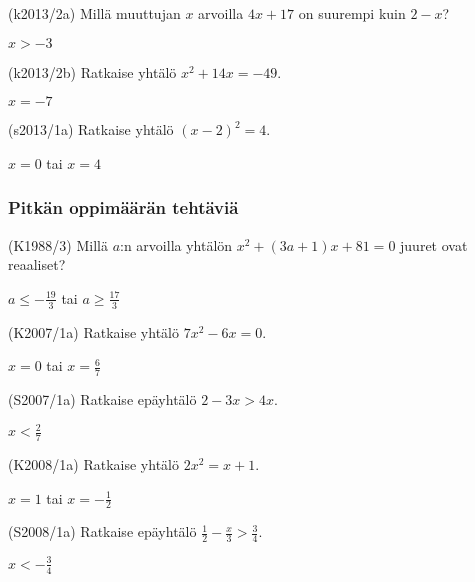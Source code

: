 \begin{tehtava}
(k2013/2a) Millä muuttujan $x$ arvoilla $4x+17$ on suurempi kuin $2-x$?
\begin{vastaus}
$x>-3$
\end{vastaus}
\end{tehtava}

\begin{tehtava}
(k2013/2b) Ratkaise yhtälö $x^2+14x=-49$.
\begin{vastaus}
$x=-7$
\end{vastaus}
\end{tehtava}

\begin{tehtava}
(s2013/1a) Ratkaise yhtälö $(x-2)^2=4$.
\begin{vastaus}
$x=0$ tai $x=4$ 
\end{vastaus}
\end{tehtava}

\subsubsection*{Pitkän oppimäärän tehtäviä}

\begin{tehtava}
(K1988/3) Millä $a$:n arvoilla yhtälön $x^2+(3a+1)x+81=0$ juuret ovat reaaliset?
\begin{vastaus}
$a \leq -\frac{19}{3}$ tai $a \geq \frac{17}{3}$
\end{vastaus}
\end{tehtava}

\begin{tehtava}
(K2007/1a) Ratkaise yhtälö $7x^2-6x=0$.
\begin{vastaus}
$x=0$ tai $x=\frac{6}{7}$
\end{vastaus}
\end{tehtava}

\begin{tehtava}
(S2007/1a) Ratkaise epäyhtälö $2-3x>4x$.
\begin{vastaus}
$x< \frac{2}{7} $
\end{vastaus}
\end{tehtava}

\begin{tehtava}
(K2008/1a) Ratkaise yhtälö $2x^2=x+1$.
\begin{vastaus}
$x=1$ tai $x=-\frac{1}{2}$
\end{vastaus}
\end{tehtava}

\begin{tehtava}
(S2008/1a) Ratkaise epäyhtälö $\frac{1}{2} - \frac{x}{3} > \frac{3}{4}$.
\begin{vastaus}
$x<-\frac{3}{4}$
\end{vastaus}
\end{tehtava}

